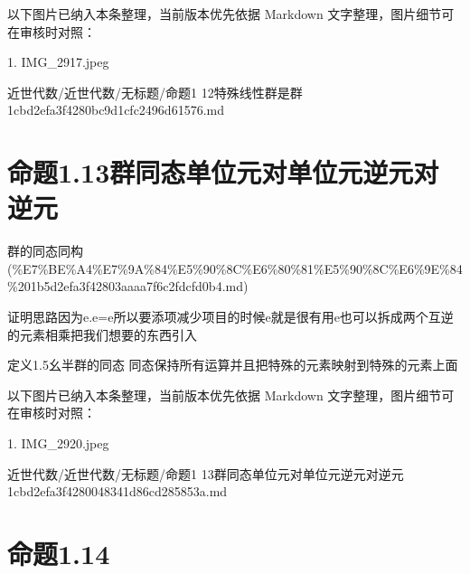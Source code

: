 \begin{note}[关联图片]
以下图片已纳入本条整理，当前版本优先依据 Markdown 文字整理，图片细节可在审核时对照：

1. IMG\_2917.jpeg\\

\end{note}

\begin{note}[来源路径]

近世代数/近世代数/无标题/命题1 12特殊线性群是群 1cbd2efa3f4280bc9d1cfc2496d61576.md

\end{note}

\section*{命题1.13群同态单位元对单位元逆元对逆元}

\begin{note}[来源上级主题]

群的同态同构 (\%E7\%BE\%A4\%E7\%9A\%84\%E5\%90\%8C\%E6\%80\%81\%E5\%90\%8C\%E6\%9E\%84\%201b5d2efa3f42803aaaa7f6c2fdcfd0b4.md)

\end{note}

\begin{proposition}[命题1.13群同态单位元对单位元逆元对逆元]

证明思路因为e.e=e所以要添项减少项目的时候e就是很有用e也可以拆成两个互逆的元素相乘把我们想要的东西引入

定义1.5幺半群的同态 同态保持所有运算并且把特殊的元素映射到特殊的元素上面

\end{proposition}

\begin{note}[关联图片]
以下图片已纳入本条整理，当前版本优先依据 Markdown 文字整理，图片细节可在审核时对照：

1. IMG\_2920.jpeg\\

\end{note}

\begin{note}[来源路径]

近世代数/近世代数/无标题/命题1 13群同态单位元对单位元逆元对逆元 1cbd2efa3f4280048341d86cd285853a.md

\end{note}

\section*{命题1.14}

